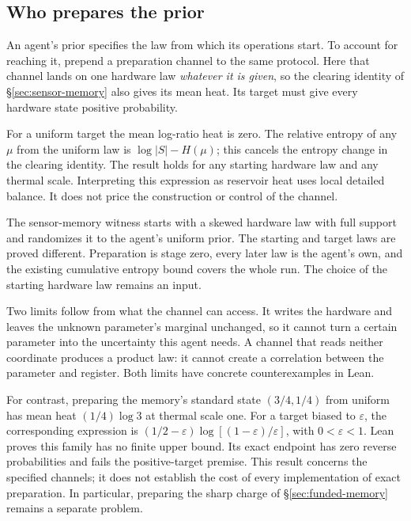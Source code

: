 \documentclass[11pt]{article}
\begin{document}
\subsection{Who prepares the prior}
\label{sec:preparation}

An agent's prior specifies the law from which its operations start. To account
for reaching it, prepend a preparation channel to the same protocol. Here that
channel lands on one hardware law \emph{whatever it is given}, so the clearing
identity of \S\ref{sec:sensor-memory} also gives its mean heat. Its target must
give every hardware state positive probability.

For a uniform target the mean log-ratio heat is zero. The relative entropy of
any $\mu$ from the uniform law is $\log|S|-H(\mu)$; this cancels the entropy
change in the clearing identity. The result holds for any starting hardware law
and any thermal scale. Interpreting this expression as reservoir heat uses local
detailed balance. It does not price the construction or control of the channel.

The sensor-memory witness starts with a skewed hardware law with full support
and randomizes it to the agent's uniform prior. The starting and target laws
are proved different. Preparation is stage zero, every later law is the agent's
own, and the existing cumulative entropy bound covers the whole run. The choice
of the starting hardware law remains an input.

Two limits follow from what the channel can access. It writes the hardware and
leaves the unknown parameter's marginal unchanged, so it cannot turn a certain
parameter into the uncertainty this agent needs. A channel that reads neither
coordinate produces a product law: it cannot create a correlation between the
parameter and register. Both limits have concrete counterexamples in Lean.

For contrast, preparing the memory's standard state $(3/4,1/4)$ from uniform
has mean heat $(1/4)\log3$ at thermal scale one. For a target biased to
$\varepsilon$, the corresponding expression is
$(1/2-\varepsilon)\log[(1-\varepsilon)/\varepsilon]$, with
$0<\varepsilon<1$. Lean proves this family has no finite upper bound. Its exact
endpoint has zero reverse probabilities and fails the positive-target premise.
This result concerns the specified channels; it does not establish the cost of
every implementation of exact preparation. In particular, preparing the sharp
charge of \S\ref{sec:funded-memory} remains a separate problem.
\end{document}
